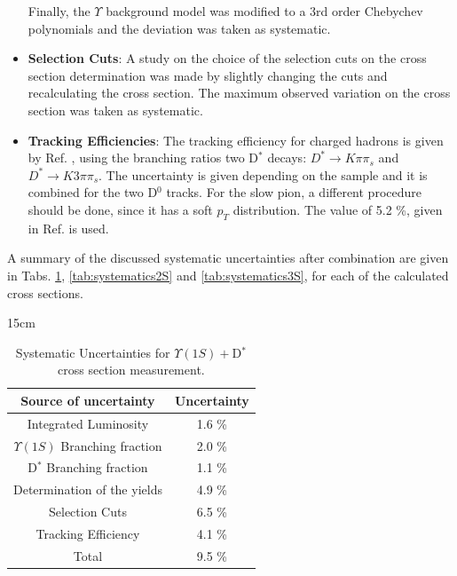 \begin{itemize}
        Finally, the $\Upsilon$ background model was modified to a 3rd order Chebychev polynomials and the deviation was taken as systematic.
  \item \textbf{Selection Cuts}: A study on the choice of the selection cuts on the cross section determination was made by slightly changing the cuts and recalculating the cross section. The maximum observed variation on the cross section was taken as systematic.
  \item \textbf{Tracking Efficiencies}: The tracking efficiency for charged hadrons is given by Ref. \cite{CMS-DP-2022-012}, using the branching ratios two D$^*$ decays: $D^* \rightarrow K\pi\pi_s$ and $D^* \rightarrow K3\pi\pi_s$. The uncertainty is given depending on the sample and it is combined for the two D$^0$ tracks. For the slow pion, a different procedure should be done, since it has a soft $p_T$ distribution. The value of 5.2 \%, given in Ref. \cite{CMS:2021lab} is used.
\end{itemize}

A summary of the discussed systematic uncertainties after combination are given in Tabs. \ref{tab:systematics1S}, \ref{tab:systematics2S} and \ref{tab:systematics3S}, for each of the calculated cross sections.

\begin{table}[!htbp]{15cm}
  \caption{Systematic Uncertainties for $\Upsilon(1S) + $D$^{*}$ cross section measurement.}
  \begin{tabular}{ c | c }
    \hline
    Source of uncertainty             & Uncertainty \\ \hline
    Integrated Luminosity             & 1.6 \%      \\ \hline
    $\Upsilon(1S)$ Branching fraction & 2.0 \%      \\ \hline
    D$^*$ Branching fraction          & 1.1 \%      \\ \hline
    Determination of the yields       & 4.9 \%      \\ \hline
    Selection Cuts                    & 6.5 \%      \\ \hline
    Tracking Efficiency               & 4.1 \%      \\ \hline
    Total                             & 9.5 \%      \\ \hline
  \end{tabular}
  \label{tab:systematics1S}
\end{table}

